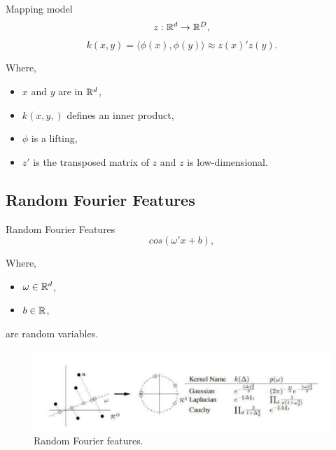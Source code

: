 \documentclass[unknownkeysallowed]{beamer}
\begin{document}
\begin{frame}{Mapping model}
{ \[ z: \mathbb{R}^d \rightarrow \mathbb{R}^D, \] 
\begin{equation*}
    k(x, y) = \langle \phi(x), \phi(y) \rangle \approx z(x)' z(y).
\end{equation*}}
\medskip

Where, 
\begin{itemize}
    \item $x$ and $y$ are in $\mathbb{R}^d$, 
    \item $k(x,y,)$ defines an inner product,
    \item $\phi$ is a lifting,
    \item $z'$ is the transposed matrix of $z$ and $z$ is low-dimensional.
\end{itemize}
\end{frame}

\subsection{Random Fourier Features}
\label{sub:Random Fourier Features}

\begin{frame}{Random Fourier Features}
{ \[ cos(\omega' x + b), \] }
\medskip

Where,
\begin{itemize}
    \item $\omega \in \mathbb{R}^d$,  
    \item  $b \in \mathbb{R}$,
\end{itemize}
are random variables. 
\begin{figure}
    \centering
    \includegraphics[scale=0.6]{images/Random_fourier_features.pdf}
    \caption{Random Fourier features.}
    \label{Projection_data_points}
\end{figure}
\end{frame}
\end{document}
